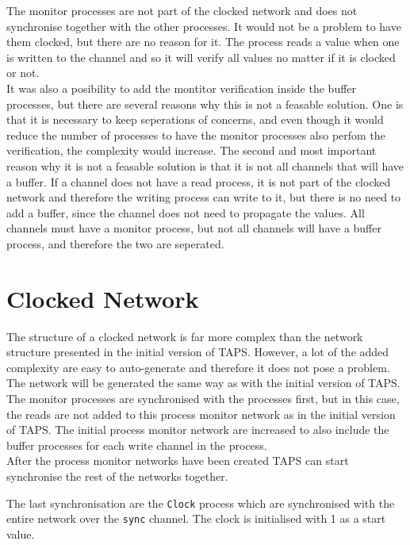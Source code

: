 The monitor processes are not part of the clocked network and does not synchronise together with the other processes. It would not be a problem to have them clocked, but there are no reason for it. The process reads a value when one is written to the channel and so it will verify all values no matter if it is clocked or not.\\

It was also a posibility to add the montitor verification inside the buffer processes, but there are several reasons why this is not a feasable solution. One is that it is necessary to keep seperations of concerns, and even though it would reduce the number of processes to have the monitor processes also perfom the verification, the complexity would increase. The second and most important reason why it is not a feasable solution is that it is not all channels that will have a buffer. If a channel does not have a read process, it is not part of the clocked network and therefore the writing process can write to it, but there is no need to add a buffer, since the channel does not need to propagate the values. All channels must have a monitor process, but not all channels will have a buffer process, and therefore the two are seperated.

\section{Clocked Network}

The structure of a clocked network is far more complex than the network structure presented in the initial version of TAPS. However, a lot of the added complexity are easy to auto-generate and therefore it does not pose a problem. The network will be generated the same way as with the initial version of TAPS. The monitor processes are synchronised with the processes first, but in this case, the reads are not added to this process monitor network as in the initial version of TAPS. The initial process monitor network are increased to also include the buffer processes for each write channel in the process. \\

After the process monitor networks have been created TAPS can start synchronise the rest of the networks together.

The last synchronisation are the \texttt{Clock} process which are synchronised with the entire network over the \texttt{sync} channel. The clock is initialised with 1 as a start value.

